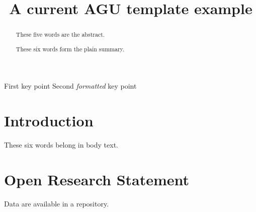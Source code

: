 \documentclass[draft]{agujournal2025}
\begin{document}
\title{A current AGU template example}
\keypoints%
{First key point}
{Second \textit{formatted} key point}
{}
\maketitle
\begin{abstract}
These five words are the abstract.
\begin{plainlanguagesummary}
These six words form the plain summary.
\end{plainlanguagesummary}
\end{abstract}
\section{Introduction}
These six words belong in body text.
\section*{Open Research Statement}
Data are available in a repository.
\end{document}

